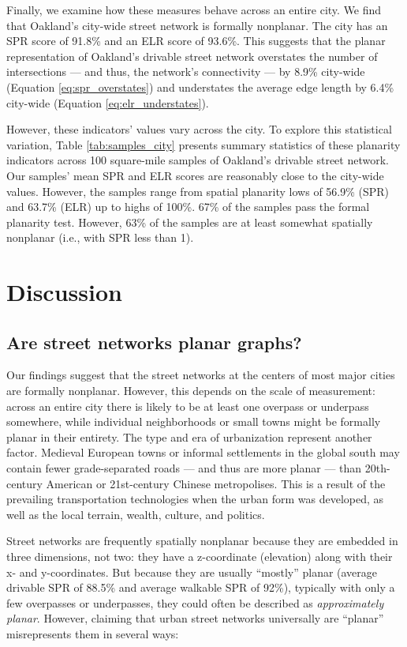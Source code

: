 \documentclass[Afour,sageh,times]{sagej}
\begin{document}
Finally, we examine how these measures behave across an entire city. We find that Oakland's city-wide street network is formally nonplanar. The city has an SPR score of 91.8\% and an ELR score of 93.6\%. This suggests that the planar representation of Oakland's drivable street network overstates the number of intersections --- and thus, the network's connectivity --- by 8.9\% city-wide (Equation \ref{eq:spr_overstates}) and understates the average edge length by 6.4\% city-wide (Equation \ref{eq:elr_understates}).

However, these indicators' values vary across the city. To explore this statistical variation, Table \ref{tab:samples_city} presents summary statistics of these planarity indicators across 100 square-mile samples of Oakland's drivable street network. Our samples' mean SPR and ELR scores are reasonably close to the city-wide values. However, the samples range from spatial planarity lows of 56.9\% (SPR) and 63.7\% (ELR) up to highs of 100\%. 67\% of the samples pass the formal planarity test. However, 63\% of the samples are at least somewhat spatially nonplanar (i.e., with SPR less than 1).



\section{Discussion}

\subsection{Are street networks planar graphs?}

Our findings suggest that the street networks at the centers of most major cities are formally nonplanar. However, this depends on the scale of measurement: across an entire city there is likely to be at least one overpass or underpass somewhere, while individual neighborhoods or small towns might be formally planar in their entirety. The type and era of urbanization represent another factor. Medieval European towns or informal settlements in the global south may contain fewer grade-separated roads --- and thus are more planar --- than 20th-century American or 21st-century Chinese metropolises. This is a result of the prevailing transportation technologies when the urban form was developed, as well as the local terrain, wealth, culture, and politics.

Street networks are frequently spatially nonplanar because they are embedded in three dimensions, not two: they have a z-coordinate (elevation) along with their x- and y-coordinates. But because they are usually \enquote{mostly} planar (average drivable SPR of 88.5\% and average walkable SPR of 92\%), typically with only a few overpasses or underpasses, they could often be described as \emph{approximately planar}. However, claiming that urban street networks universally are \enquote{planar} misrepresents them in several ways:
\end{document}
